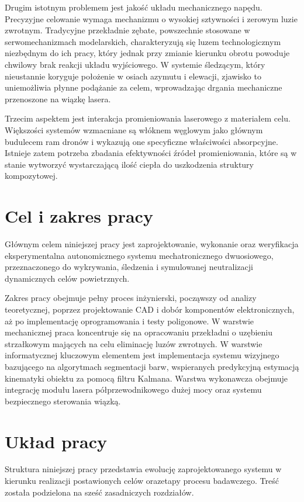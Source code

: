 \documentclass[a4paper,twoside,12pt]{book}
\begin{document}
Drugim istotnym problemem jest jakość układu mechanicznego napędu. Precyzyjne celowanie wymaga mechanizmu o wysokiej sztywności i zerowym luzie zwrotnym. Tradycyjne przekładnie zębate, powszechnie stosowane w serwomechanizmach modelarskich, charakteryzują się luzem technologicznym niezbędnym do ich pracy, który jednak przy zmianie kierunku obrotu powoduje chwilowy brak reakcji układu wyjściowego. W systemie śledzącym, który nieustannie koryguje położenie w osiach azymutu i elewacji, zjawisko to uniemożliwia płynne podążanie za celem, wprowadzając drgania mechaniczne przenoszone na wiązkę lasera. 

Trzecim aspektem jest interakcja promieniowania laserowego z materiałem celu. Większości systemów wzmacniane są włóknem węglowym jako głównym budulecem ram dronów i wykazują one specyficzne właściwości absorpcyjne. Istnieje zatem potrzeba zbadania efektywności źródeł promieniowania, które są w stanie wytworzyć wystarczającą ilość ciepła do uszkodzenia struktury kompozytowej.

\section{Cel i zakres pracy}

Głównym celem niniejszej pracy jest zaprojektowanie, wykonanie oraz weryfikacja eksperymentalna autonomicznego systemu mechatronicznego dwuosiowego, przeznaczonego do wykrywania, śledzenia i symulowanej neutralizacji dynamicznych celów powietrznych.

Zakres pracy obejmuje pełny proces inżynierski, począwszy od analizy teoretycznej, poprzez projektowanie CAD i dobór komponentów elektronicznych, aż po implementację oprogramowania i testy poligonowe. W warstwie mechanicznej praca koncentruje się na opracowaniu przekładni o uzębieniu strzałkowym mających na celu eliminację luzów zwrotnych. W warstwie informatycznej kluczowym elementem jest implementacja systemu wizyjnego bazującego na algorytmach segmentacji barw, wspieranych predykcyjną estymacją kinematyki obiektu za pomocą filtru Kalmana. Warstwa wykonawcza obejmuje integrację modułu lasera półprzewodnikowego dużej mocy oraz systemu bezpiecznego sterowania wiązką.

\section{Układ pracy}

Struktura niniejszej pracy przedstawia ewolucję zaprojektowanego systemu w kierunku realizacji postawionych celów orazetapy procesu badawczego.
Treść została podzielona na sześć zasadniczych rozdziałów.
\end{document}
